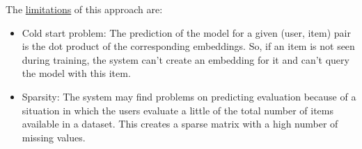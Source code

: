 \documentclass{article}
\begin{document}
\begin{itemize}
\begin{itemize}
      \end{itemize}
      The \underline{limitations} of this approach are:
      \begin{itemize}
            \item Cold start problem: The prediction of the model for a given (user, item) pair is the dot product of the corresponding embeddings. So, if an item is not seen during training, the system can't create an embedding for it and can't query the model with this item.
            \item Sparsity: The system may find problems on predicting evaluation because of a situation in which the users evaluate a little of the total number of items available in a dataset. This creates a sparse matrix with a high number of missing values.
      \end{itemize}


\end{itemize}
\end{document}
